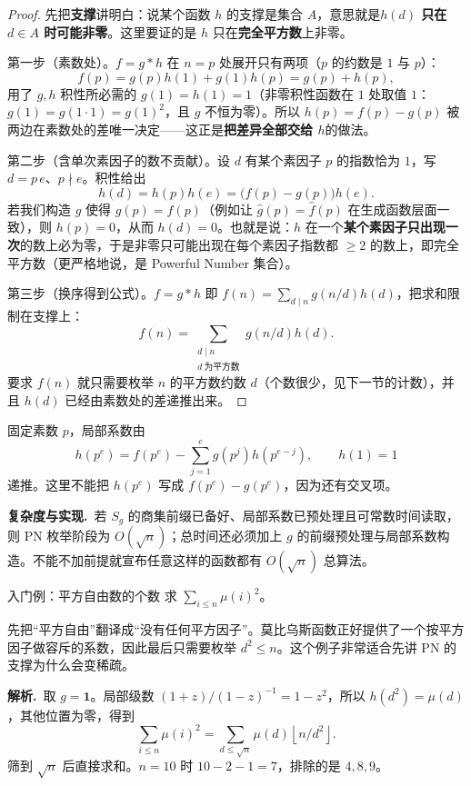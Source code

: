 \documentclass[UTF8,a4paper,11pt,twoside,openright,fontset=fandol]{ctexbook}
\theoremstyle{definition}
\newcommand{\one}{\mathbf 1}
\newcommand{\floor}[1]{\left\lfloor #1\right\rfloor}
\newcommand{\sol}{\par\noindent\textbf{解析.}\ }
\newcommand{\cost}{\par\noindent\textbf{复杂度与实现.}\ }
\begin{document}
\begin{proof}
先把\textbf{支撑}讲明白：说某个函数 $h$ 的支撑是集合 $A$，意思就是\textbf{$h(d)$ 只在 $d\in A$ 时可能非零}。这里要证的是 $h$ 只在\textbf{完全平方数}上非零。

第一步（素数处）。$f=g*h$ 在 $n=p$ 处展开只有两项（$p$ 的约数是 $1$ 与 $p$）：
\[
 f(p)=g(p)h(1)+g(1)h(p)=g(p)+h(p),
\]
用了 $g,h$ 积性所必需的 $g(1)=h(1)=1$（非零积性函数在 $1$ 处取值 $1$：$g(1)=g(1\cdot1)=g(1)^2$，且 $g$ 不恒为零）。所以 $h(p)=f(p)-g(p)$ 被两边在素数处的差唯一决定——这正是\textbf{把差异全部交给 $h$}的做法。

第二步（含单次素因子的数不贡献）。设 $d$ 有某个素因子 $p$ 的指数恰为 $1$，写 $d=p\,e$、$p\nmid e$。积性给出
\[
 h(d)=h(p)h(e)=\big(f(p)-g(p)\big)h(e).
\]
若我们构造 $g$ 使得 $g(p)=f(p)$（例如让 $\hat g(p)=\hat f(p)$ 在生成函数层面一致），则 $h(p)=0$，从而 $h(d)=0$。也就是说：$h$ 在一个\textbf{某个素因子只出现一次}的数上必为零，于是非零只可能出现在每个素因子指数都 $\ge2$ 的数上，即完全平方数（更严格地说，是 Powerful Number 集合）。

第三步（换序得到公式）。$f=g*h$ 即 $f(n)=\sum_{d\mid n}g(n/d)h(d)$，把求和限制在支撑上：
\[
 f(n)=\sum_{\substack{d\mid n\\ d\ \text{为平方数}}} g(n/d)h(d).
\]
要求 $f(n)$ 就只需要枚举 $n$ 的平方数约数 $d$（个数很少，见下一节的计数），并且 $h(d)$ 已经由素数处的差递推出来。
\end{proof}
固定素数 $p$，局部系数由
\[
 h(p^e)=f(p^e)-\sum_{j=1}^e g(p^j)h(p^{e-j}),\qquad h(1)=1
\]
递推。这里不能把 $h(p^e)$ 写成 $f(p^e)-g(p^e)$，因为还有交叉项。
\cost 若 $S_g$ 的商集前缀已备好、局部系数已预处理且可常数时间读取，则 PN 枚举阶段为 $O(\sqrt n)$；总时间还必须加上 $g$ 的前缀预处理与局部系数构造。不能不加前提就宣布任意这样的函数都有 $O(\sqrt n)$ 总算法。

\begin{problem}{入门例：平方自由数的个数}
求 $\sum_{i\le n}\mu(i)^2$。
\end{problem}
\begin{pitfall}[讲解：先看这题到底在做什么]
先把“平方自由”翻译成“没有任何平方因子”。莫比乌斯函数正好提供了一个按平方因子做容斥的系数，因此最后只需要枚举 $d^2\le n$。这个例子非常适合先讲 PN 的支撑为什么会变稀疏。
\end{pitfall}

\sol 取 $g=\one$。局部级数 $(1+z)/(1-z)^{-1}=1-z^2$，所以 $h(d^2)=\mu(d)$，其他位置为零，得到
\[
 \sum_{i\le n}\mu(i)^2=\sum_{d\le\sqrt n}\mu(d)\floor{n/d^2}.
\]
筛到 $\sqrt n$ 后直接求和。$n=10$ 时 $10-2-1=7$，排除的是 $4,8,9$。
\end{document}
